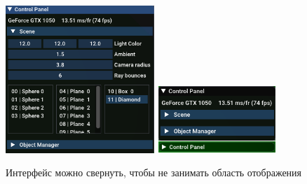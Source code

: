 \begin{figure}[h]
    \centering
    \includegraphics[width=0.5\textwidth]{img/screenshot/ui3.png}
    \includegraphics[width=0.4\textwidth]{img/screenshot/ui4.png}
    \caption{Интерфейс можно свернуть, чтобы не занимать область отображения}
    \label{fig:3.2}
\end{figure}
